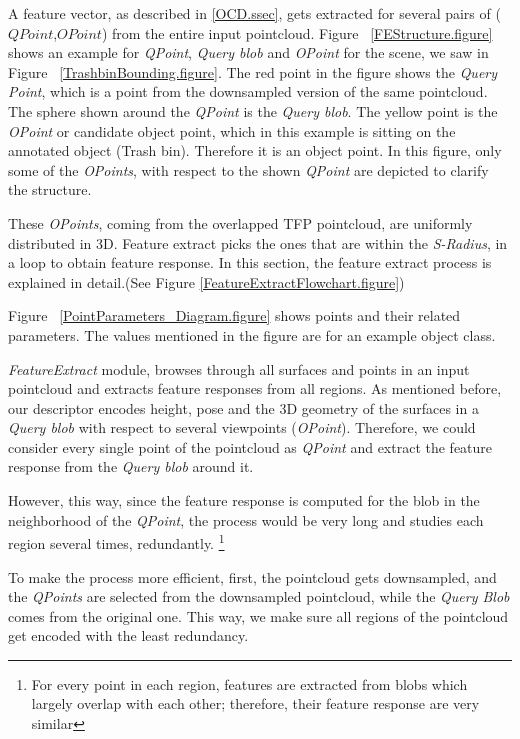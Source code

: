 A feature vector, as described in \ref{OCD.ssec}, gets extracted for several pairs of ($QPoint$,$OPoint$) from the entire input pointcloud. 
Figure ~\ref{FEStructure.figure} shows an example for {\it QPoint}, {\it Query blob} and {\it OPoint} for the scene, we saw in Figure 
 ~\ref{TrashbinBounding.figure}. The red point in the figure shows the {\it Query Point}, which is a point from the downsampled version of the same pointcloud. The sphere shown around the {\it QPoint} is the {\it Query blob}. The yellow point is the {\it OPoint} or candidate object point, which in this example is sitting on the annotated object (Trash bin). Therefore it is an object point. In this figure, only some of the {\it OPoints}, with respect to the shown {\it QPoint} are depicted to clarify the structure. 
 
 
 These {\it OPoints}, coming from the overlapped TFP pointcloud, are uniformly distributed in 3D. Feature extract picks the ones that are within the {\it S-Radius}, in a loop to obtain feature response. In this section, the feature extract process is explained in detail.(See Figure \ref{FeatureExtractFlowchart.figure})
 
 Figure ~\ref{PointParameters_Diagram.figure} shows points and their related parameters. The values mentioned in the figure are for an example object class.
 
 
{\it FeatureExtract} module, browses through all surfaces and points in an input pointcloud and extracts feature responses from all regions. As mentioned before, our descriptor encodes height, pose and the 3D geometry of the surfaces in a {\it Query blob} with respect to several viewpoints ({\it OPoint}). Therefore, we could consider every single point of the pointcloud as {\it QPoint} and extract the feature response from the {\it Query blob} around it. 

However, this way, since the feature response is computed for the blob in the neighborhood of the {\it QPoint}, the process would be very long and studies each region several times, redundantly. \footnote{For every point in each region, features are extracted from blobs which largely overlap with each other; therefore, their feature response are very similar} 


To make the process more efficient, first, the pointcloud gets downsampled, and the {\it QPoints} are selected from the downsampled pointcloud, while the {\it Query Blob} comes from the original one. This way, we make sure all regions of the pointcloud get encoded with the least redundancy. 

